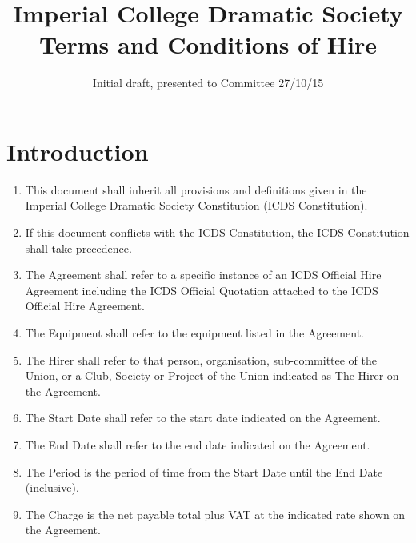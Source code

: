 \documentclass[a4paper]{tufte-handout}
\title{Imperial College Dramatic Society Terms and Conditions of Hire}
\date{Initial draft, presented to Committee 27/10/15}
\begin{document}
\maketitle

\begin{fullwidth}
\itshape

\begin{abstract}

\end{abstract}
\end{fullwidth}

\hdashrule{15cm}{1.1pt}{1.1pt}

\section{Introduction}
\begin{enumerate}
    \item This document shall inherit all provisions and definitions given in the Imperial College Dramatic Society Constitution (ICDS Constitution).
    \item If this document conflicts with the ICDS Constitution, the ICDS Constitution shall take precedence.
    \item The Agreement shall refer to a specific instance of an ICDS Official Hire Agreement including the ICDS Official Quotation attached to the ICDS Official Hire Agreement.
    \item The Equipment shall refer to the equipment listed in the Agreement.
    \item The Hirer shall refer to that person, organisation, sub-committee of the Union, or a Club, Society or Project of the Union indicated as The Hirer on the Agreement.
    \item The Start Date shall refer to the start date indicated on the Agreement.
    \item The End Date shall refer to the end date indicated on the Agreement.
    \item The Period is the period of time from the Start Date until the End Date (inclusive).
    \item The Charge is the net payable total plus VAT at the indicated rate shown on the Agreement.
\end{enumerate}
\end{document}
